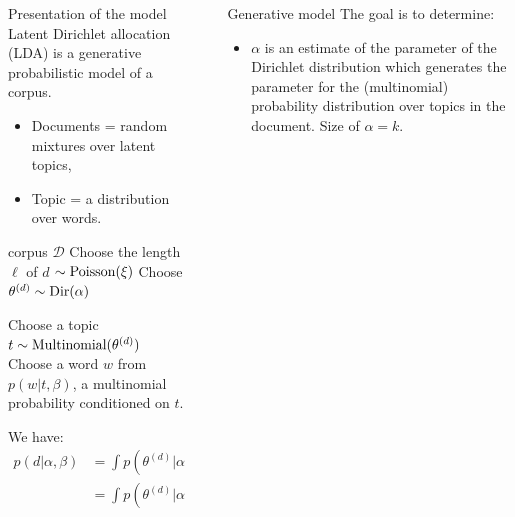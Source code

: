 \documentclass[final]{beamer}
\newlength{\sepwid}
\newlength{\onecolwid}
\begin{document}
\begin{frame}[t]
\begin{columns}[t]
\begin{column}{\onecolwid}
\begin{block}{Presentation of the model}
Latent Dirichlet allocation (LDA) is a generative probabilistic model of a corpus. 
\begin{itemize}
  \item Documents = random mixtures over latent topics,
  \item Topic = a distribution over words. 
\end{itemize} 

\medskip

\begin{algorithmic}[1]
\ENSURE corpus $\mathcal{D}$
\STATE Choose the length $\ell$ of $d$ $\sim \textnormal{Poisson}(\xi)$
\STATE Choose $\theta^{(d)} \sim \textnormal{Dir}(\alpha)$

\STATE Choose a topic $t \sim \textnormal{Multinomial}(\theta^{(d)})$
\STATE Choose a word $w$ from $p(w | t, \beta)$, a multinomial probability conditioned on $t$.
\ENDFOR
\ENDFOR
\end{algorithmic}

We have:
\begin{align*}
p(d|\alpha, \beta) 
& = \int p(\theta^{(d)}|\alpha) \left( \prod_{n=1}^{N_{d}} p(w_n^{(d)}|\theta^{(d)}, \beta)\right) \text{d}\theta  \\
& = \int p(\theta^{(d)}|\alpha) \left( \prod_{n=1}^{N_{d}} \sum_{z_n^{(d)}} p(z_n^{(d)}|\theta^{(d)}) p(w_n^{(d)}|z_n^{(d)}, \beta)\right) \text{d}\theta
\end{align*}

\end{block}

\end{column}



\begin{column}{\sepwid}\end{column} %
\begin{column}{\onecolwid}
\begin{block}{Generative model}
The goal is to determine:
\begin{itemize}
\item $\alpha$ is an estimate of the parameter of the Dirichlet distribution which generates the parameter for the (multinomial) probability distribution over topics in the document. Size of $\alpha = k$.


\end{itemize}
\end{block}
\end{column}
\end{columns}
\end{frame}
\end{document}
